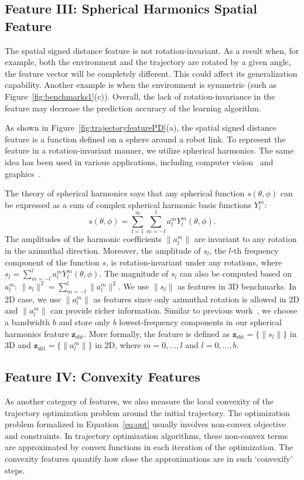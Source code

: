 \documentclass[letterpaper, 10 pt, conference]{ieeeconf}  %
\newcommand{\fsht}{\mbox{$\mathbf z_{\text{sht}}$}}
\begin{document}
\subsection{Feature III: Spherical Harmonics Spatial Feature}
The spatial signed distance feature is not rotation-invariant.
As a result when, for example, both the environment and the trajectory are rotated by a given angle, the feature vector will be completely different.  This could affect its generalization capability. Another example is when the environment is symmetric (such as Figure~\ref{fig:benchmarks1}(c)).  Overall, the lack of rotation-invariance in the feature may decrease the prediction accuracy of the learning algorithm.


As shown in Figure~\ref{fig:trajectoryfeaturePD}(a), the spatial signed distance feature is a function defined on a sphere around a robot link. To represent the feature in a rotation-invariant manner, we utilize spherical harmonics. The same idea has been used in various applications, including computer vision~\cite{Frome:2004:ROR} and graphics~\cite{Kazhdan:2003:RIS}.

The theory of spherical harmonics says that any spherical function $s(\theta, \phi)$ can be expressed as a sum of complex spherical harmonic basis functions $Y_l^m$: 
\begin{equation}
s(\theta, \phi) = \sum_{l=1}^{\infty} \sum_{m=-l}^{l} a_l^m Y_l^m(\theta, \phi).
\end{equation}
The amplitudes of the harmonic coefficients $\|a_l^m\|$ are invariant to any rotation in the azimuthal direction. Moreover, the amplitude of $s_l$, the $l$-th frequency component of the function $s$, is rotation-invariant under any rotations, where $s_l = \sum_{m=-l}^{l}a_l^m Y_l^m(\theta, \phi)$. The magnitude of $s_l$ can also be computed based on $a_l^m$: $\|s_l\|^2 = \sum_{m=-l}^l \|a_l^m\|^2$. We use $\|s_l\|$ as features in 3D benchmarks. In 2D case, we use $\|a_l^m\|$ as features since only azimuthal rotation is allowed in 2D and $\|a_l^m\|$ can provide richer information. Similar to previous work~\cite{Frome:2004:ROR,Kazhdan:2003:RIS}, we choose a bandwidth $b$ and store only $b$ lowest-frequency components in our spherical harmonics feature $\fsht$. More formally, the feature is defined as $\fsht = \{\|s_l\|\}$ in 3D and $\fsht = \{\|a_l^m\|\}$ in 2D, where $m = 0,...,l$ and $l = 0,...,b$.


\subsection{Feature IV: Convexity Features}
As another category of features, we also measure the local convexity of the trajectory optimization problem around the initial trajectory. 
The optimization problem formalized in Equation~\ref{eq:opt} usually involves non-convex objective and constraints. In trajectory optimization algorithms, these non-convex terms are approximated by convex functions in each iteration of the optimization. The convexity features quantify how close the approximations are in such `convexify' steps.
\end{document}
